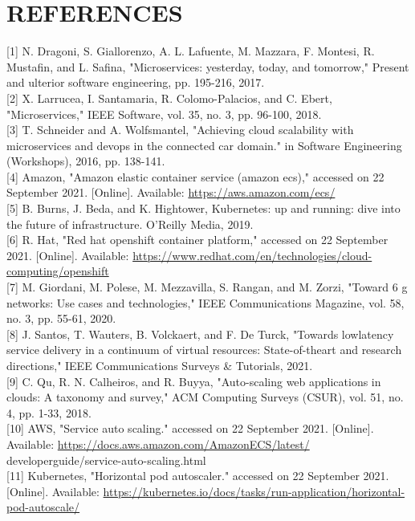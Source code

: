 \documentclass[10pt]{article}
\begin{document}
\section*{REFERENCES}
[1] N. Dragoni, S. Giallorenzo, A. L. Lafuente, M. Mazzara, F. Montesi, R. Mustafin, and L. Safina, "Microservices: yesterday, today, and tomorrow," Present and ulterior software engineering, pp. 195-216, 2017.\\[0pt]
[2] X. Larrucea, I. Santamaria, R. Colomo-Palacios, and C. Ebert, "Microservices," IEEE Software, vol. 35, no. 3, pp. 96-100, 2018.\\[0pt]
[3] T. Schneider and A. Wolfsmantel, "Achieving cloud scalability with microservices and devops in the connected car domain." in Software Engineering (Workshops), 2016, pp. 138-141.\\[0pt]
[4] Amazon, "Amazon elastic container service (amazon ecs)," accessed on 22 September 2021. [Online]. Available: \href{https://aws.amazon.com/ecs/}{https://aws.amazon.com/ecs/}\\[0pt]
[5] B. Burns, J. Beda, and K. Hightower, Kubernetes: up and running: dive into the future of infrastructure. O'Reilly Media, 2019.\\[0pt]
[6] R. Hat, "Red hat openshift container platform," accessed on 22 September 2021. [Online]. Available: \href{https://www.redhat.com/en/technologies/cloud-computing/openshift}{https://www.redhat.com/en/technologies/cloud-computing/openshift}\\[0pt]
[7] M. Giordani, M. Polese, M. Mezzavilla, S. Rangan, and M. Zorzi, "Toward 6 g networks: Use cases and technologies," IEEE Communications Magazine, vol. 58, no. 3, pp. 55-61, 2020.\\[0pt]
[8] J. Santos, T. Wauters, B. Volckaert, and F. De Turck, "Towards lowlatency service delivery in a continuum of virtual resources: State-of-theart and research directions," IEEE Communications Surveys \& Tutorials, 2021.\\[0pt]
[9] C. Qu, R. N. Calheiros, and R. Buyya, "Auto-scaling web applications in clouds: A taxonomy and survey," ACM Computing Surveys (CSUR), vol. 51, no. 4, pp. 1-33, 2018.\\[0pt]
[10] AWS, "Service auto scaling." accessed on 22 September 2021. [Online]. Available: \href{https://docs.aws.amazon.com/AmazonECS/latest/}{https://docs.aws.amazon.com/AmazonECS/latest/} developerguide/service-auto-scaling.html\\[0pt]
[11] Kubernetes, "Horizontal pod autoscaler." accessed on 22 September 2021. [Online]. Available: \href{https://kubernetes.io/docs/tasks/run-application/horizontal-pod-autoscale/}{https://kubernetes.io/docs/tasks/run-application/horizontal-pod-autoscale/}\\[0pt]
\end{document}
